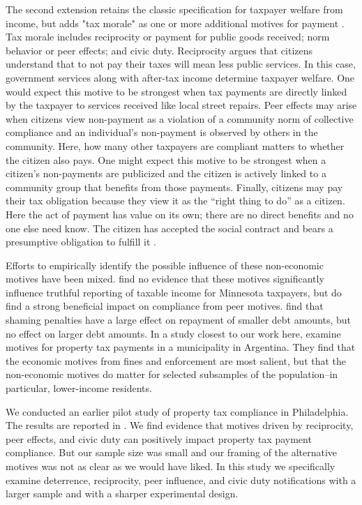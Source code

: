 \documentclass[12pt]{article}
\begin{document}
The second extension retains the classic specification for taxpayer
welfare from income, but adds "tax morale" as one or more additional
motives for payment \cite{Luttmer-14}.  Tax morale includes
reciprocity or payment for public goods received; norm behavior or
peer effects; and civic duty.  Reciprocity argues that citizens
understand that to not pay their taxes will mean less public services.
In this case, government services along with after-tax income
determine taxpayer welfare.  One would expect this motive to be
strongest when tax payments are directly linked by the taxpayer to
services received like local street repairs.  Peer effects may arise
when citizens view non-payment as a violation of a community norm of
collective compliance and an individual's non-payment is observed by
others in the community.  Here, how many other taxpayers are compliant
matters to whether the citizen also pays.  One might
expect this motive to be strongest when a citizen's non-payments are
publicized and the citizen is actively linked to a community group
that benefits from those payments.  Finally, citizens may pay their
tax obligation because they view it as the ``right thing to do'' as a
citizen.  Here the act of payment has value on its own; there are no
direct benefits and no one else need know.  The citizen has accepted
the social contract and bears a presumptive obligation to fulfill it
\cite{Rawls-71}.

Efforts to empirically identify the possible influence of these
non-economic motives have been mixed.   find no
evidence that these motives significantly influence truthful reporting
of taxable income for Minnesota taxpayers, but 
do find a strong beneficial impact on compliance from peer motives.
 find that shaming penalties have a large
effect on repayment of smaller debt amounts, but no effect on larger
debt amounts.  In a study closest to our work here, 
examine motives for property tax payments in a municipality in
Argentina.  They find that the economic motives from fines and
enforcement are most salient, but that the non-economic motives do
matter for selected subsamples of the population--in particular,
lower-income residents.

We conducted an earlier pilot study of property tax compliance in
Philadelphia.  The results are reported in .  We
find evidence that motives driven by reciprocity, peer effects, and
civic duty can positively impact property tax payment compliance. But
our sample size was small and our framing of the alternative motives
was not as clear as we would have liked. In this study we specifically
examine deterrence, reciprocity, peer influence, and civic duty
notifications with a larger sample and with a sharper experimental
design.
\end{document}
